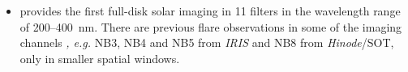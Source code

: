 \begin{itemize}[label=]
\item {\suit} provides the first full-disk solar imaging in 11 filters in the wavelength range of 200{--}400~nm. There are previous flare observations in some of the imaging channels {\it, e.g.} NB3, NB4 and NB5 from {\it IRIS} and NB8 from {\it Hinode}/SOT, only in smaller spatial windows. %
        
    \end{itemize}


